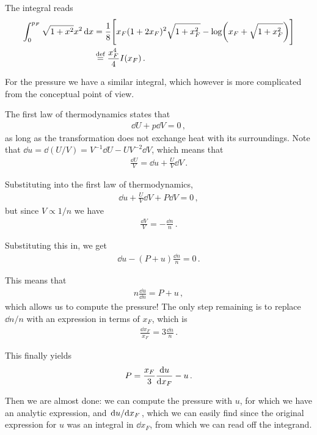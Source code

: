 \documentclass[main.tex]{subfiles}
\begin{document}
The integral reads 
%
\begin{align}
\int_0^{p_F} \sqrt{1 + x^2} x^2 \dd{x} &= \frac{1}{8} \qty[x_F (1 + 2 x_F)^2 \sqrt{1 + x_F^2} - \log(x_F + \sqrt{1 + x_F^2})]  \\
&\overset{\text{def}}{=} \frac{x_F^{4}}{4} I(x_F)
\,.
\end{align}

For the pressure we have a similar integral, which however is more complicated from the conceptual point of view. 

The first law of thermodynamics states that 
%
\begin{align}
\dd{U} + p \dd{V} = 0
\,,
\end{align}
%
as long as the transformation does not exchange heat with its surroundings. 
Note that \(\dd{u} = \dd{(U/ V)} = V^{-1} \dd{U} - U V^{-2} \dd{V}\), which means that 
%
\begin{align}
\frac{ \dd{U}}{V} = \dd{u} + \frac{U}{V} \dd{V}
\,.
\end{align}

Substituting into the first law of thermodynamics, 
%
\begin{align}
\dd{u} + \frac{U}{V} \dd{V} + P \dd{V} = 0
\,,
\end{align}
%
but since \(V \propto 1/n\) we have 
%
\begin{align}
\frac{ \dd{V}}{V} = - \frac{ \dd{n}}{n}
\,.
\end{align}

Substituting this in, we get 
%
\begin{align}
\dd{u} - (P+u) \frac{ \dd{n}}{n} = 0 
\,.
\end{align}

This means that 
%
\begin{align}
n \frac{\dd{u}}{ \dd{n}} = P + u
\,,
\end{align}
%
which allows us to compute the pressure! 
The only step remaining is to replace \(\dd{n} / n\) with an expression in terms of \(x_F\), which is 
%
\begin{align}
\frac{ \dd{x_F}}{x_F} = 3 \frac{ \dd{n}}{n}
\,.
\end{align}

This finally yields 
%
\begin{align}
P = \frac{x_F}{3} \dv{u}{x_F} - u
\,.
\end{align}

Then we are almost done: we can compute the pressure with \(u\), for which we have an analytic expression, and \(\dv*{u}{x_F}\), which we can easily find since the original expression for \(u\) was an integral in \(\dd{x_F}\), from which we can read off the integrand. 
\end{document}
